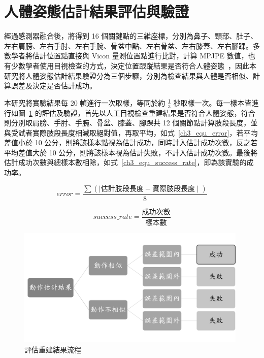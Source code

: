 \clearpage

\section{人體姿態估計結果評估與驗證}
經過感測器融合後，將得到 16 個關鍵點的三維座標，分別為鼻子、頸部、肚子、左右肩膀、左右手肘、左右手腕、骨盆中點、左右骨盆、左右膝蓋、左右腳踝。多數學者將估計位置點直接與 Vicon 量測位置點進行比對，計算 MPJPE 數值，也有少數學者使用目視檢查的方式，決定位置跟蹤結果是否符合人體姿態~\cite{nakano2020evaluation}，因此本研究將人體姿態估計結果驗證分為三個步驟，分別為檢查結果與人體是否相似、計算誤差及決定是否估計成功。

本研究將實驗結果每 20 幀進行一次取樣，等同於約 $\frac{1}{3}$ 秒取樣一次。每一樣本皆進行如圖~\ref{ch3_fig_est_flow} 的評估及驗證，首先以人工目視檢查重建結果是否符合人體姿態，符合則分別取肩膀、手肘、手腕、骨盆、膝蓋、腳踝共 12 個關節點計算肢段長度，並與受試者實際肢段長度相減取絕對值，再取平均，如式~\ref{ch3_equ_error}，若平均差值小於 10 公分，則將該樣本點視為估計成功，同時計入估計成功次數，反之若平均差值大於 10 公分，則將該樣本視為估計失敗，不計入估計成功次數。最後將估計成功次數與總樣本數相除，如式~\ref{ch3_equ_success_rate}，即為該實驗的成功率。

\begin{equation}
   error = \frac{\sum(\mid\text{估計肢段長度} - \text{實際肢段長度}\mid)}{8}
   \label{ch3_equ_error}
\end{equation}

\begin{equation}
   success\_rate = \frac{\text{成功次數}}{\text{樣本數}}
   \label{ch3_equ_success_rate}
\end{equation}

\begin{figure}[!ht]
   \centering
   \includegraphics[width=11cm]{figure/ch3_fig_est_flow.png}
    \caption[評估重建結果流程]{評估重建結果流程}
    \label{ch3_fig_est_flow}
\end{figure}

